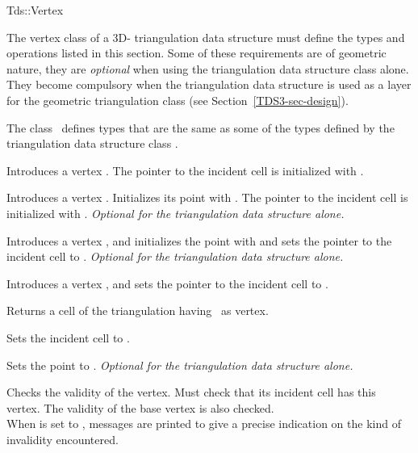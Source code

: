 	\begin{ccClass}{Tds::Vertex}
	

The vertex class of a 3D- triangulation data structure must define
the types and operations listed in this section. Some of these
requirements are of geometric nature, they are \textit{optional}
when using the triangulation data structure class alone. They become
compulsory when the triangulation data structure is used as a layer
for the geometric triangulation class (see
Section~\ref{TDS3-sec-design}).

\ccTypes
{}
\ccThreeToTwo
{} 

The class \ccClassName\ defines types that are the same as some of the 
types defined by the triangulation data structure class .

\ccGlue
{}

\ccCreation
{}

{Introduces a vertex \ccVar. 
The pointer to the incident cell is initialized with .}

{Introduces a vertex \ccVar. Initializes its point with .
The pointer to the incident cell is initialized with
. {\textit{Optional for the triangulation data structure alone.}}}

{Introduces a vertex \ccVar, and initializes the point with 
and sets the pointer to the incident cell to . {\textit{Optional for the
triangulation data structure alone.}}}

{Introduces a vertex \ccVar, and sets the pointer to the incident cell
to .}

\ccAccessFunctions

{Returns a cell of the triangulation having \ccVar\ as vertex.}


{Sets the incident cell to .}

{Sets the point to . {\textit{Optional for the
triangulation data structure alone.}}}

\begin{ccAdvanced}

{Checks the validity of the vertex. Must check that its incident cell
has this vertex. The validity of the base vertex is also checked.\\
When  is set to , messages are printed to give
a precise indication on the kind of invalidity encountered.}
\end{ccAdvanced}

	\end{ccClass} 


